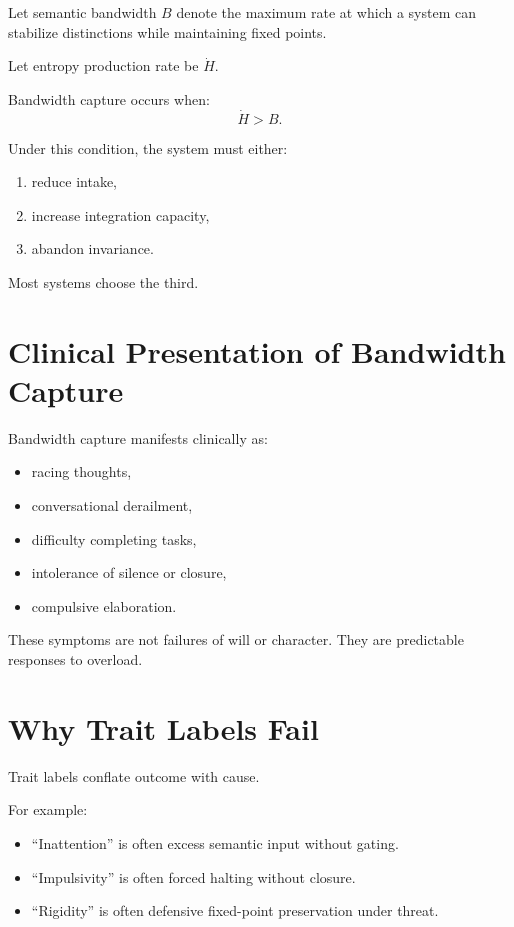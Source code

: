 \documentclass[11pt]{book}
\begin{document}
Let semantic bandwidth \(B\) denote the maximum rate at which a system can
stabilize distinctions while maintaining fixed points.

Let entropy production rate be \(\dot{H}\).

Bandwidth capture occurs when:
\[
\dot{H} > B.
\]

Under this condition, the system must either:
\begin{enumerate}
\item reduce intake,
\item increase integration capacity,
\item abandon invariance.
\end{enumerate}

Most systems choose the third.

\section{Clinical Presentation of Bandwidth Capture}

Bandwidth capture manifests clinically as:

\begin{itemize}
\item racing thoughts,
\item conversational derailment,
\item difficulty completing tasks,
\item intolerance of silence or closure,
\item compulsive elaboration.
\end{itemize}

These symptoms are not failures of will or character.
They are predictable responses to overload.

\section{Why Trait Labels Fail}

Trait labels conflate outcome with cause.

For example:
\begin{itemize}
\item ``Inattention'' is often excess semantic input without gating.
\item ``Impulsivity'' is often forced halting without closure.
\item ``Rigidity'' is often defensive fixed-point preservation under threat.
\end{itemize}
\end{document}
